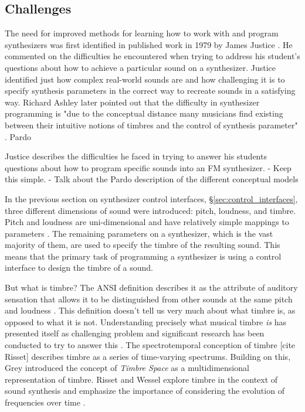 \subsection{Challenges}

The need for improved methods for learning how to work with and program synthesizers was first identified in published work in 1979 by James Justice \cite{justice1979analytic}. He commented on the difficulties he encountered when trying to address his student's questions about how to achieve a particular sound on a synthesizer. Justice identified just how complex real-world sounds are and how challenging it is to specify synthesis parameters in the correct way to recreate sounds in a satisfying way. Richard Ashley later pointed out that the difficulty in synthesizer programming is "due to the conceptual distance many musicians find existing between their intuitive notions of timbres and the control of synthesis parameter" \cite{ashley1986knowledge}. Pardo 

Justice describes the difficulties he faced in trying to answer his students questions about how to program specific sounds into an FM synthesizer. 
- Keep this simple. 
- Talk about the Pardo description of the different conceptual models


In the previous section on synthesizer control interfaces, \S\ref{sec:control_interfaces}, three different dimensions of sound were introduced: pitch, loudness, and timbre. Pitch and loudness are uni-dimensional and have relatively simple mappings to parameters \cite{seago2004critical}. The remaining parameters on a synthesizer, which is the vast majority of them, are used to specify the timbre of the resulting sound. This means that the primary task of programming a synthesizer is using a control interface to design the timbre of a sound. 

But what is timbre? The ANSI definition describes it as the attribute of auditory sensation that allows it to be distinguished from other sounds at the same pitch and loudness \cite{american1973american}. This definition doesn't tell us very much about what timbre is, as opposed to what it is not. Understanding precisely what musical timbre \textit{is} has presented itself as challenging problem \cite{krumhansl1989musical} and significant research has been conducted to try to answer this \cite{McAdams2019}. The spectrotemporal conception of timbre [cite Risset] describes timbre as a series of time-varying spectrums. Building on this, Grey introduced the concept of \textit{Timbre Space} \cite{grey1977multidimensional} as a multidimensional representation of timbre. Risset and Wessel explore timbre in the context of sound synthesis and emphasize the importance of considering the evolution of frequencies over time \cite{risset1999exploration}. 

